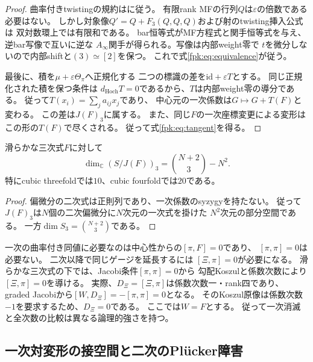 \begin{proof}
曲率付きtwistingの規約は\cite[Section~2]{CT}に従う。
有限rank MFの行列$Q$は$\varepsilon$の倍数である必要はない。
しかし対象像$Q'=Q+F_3(Q,Q,Q)$および射のtwisting挿入公式は
双対数環上では有限和である。
bar恒等式がMF方程式と関手恒等式を与え、逆bar写像で互いに逆な
$A_\infty$関手が得られる。写像は内部weight零で
$t$を微分しないので内部shiftと$(3)\simeq[2]$を保つ。
これで式\eqref{fpk:eq:equivalence}が従う。

最後に、積を$\mu+\varepsilon\Theta_\pi$へ正規化する
二つの標識の差を$\mathrm{id}+\varepsilon T$とする。
同じ正規化された積を保つ条件は
$d_{\mathrm{Hoch}}T=0$であるから、$T$は内部weight零の導分である。
従って$T(x_i)=\sum_j a_{ij}x_j$であり、
中心元の一次係数は$G\mapsto G+T(F)$と変わる。
この差は$J(F)_3$に属する。
また、同じ$F$の一次座標変更による変形は
この形の$T(F)$で尽くされる。
従って式\eqref{fpk:eq:tangent}を得る。
\end{proof}

\begin{corollary}[Jacobian接空間の次元]
\label{fpk:cor:dimension}
滑らかな三次式$F$に対して
\begin{equation}\label{fpk:eq:dimension}
 \dim_{\mathbb C}(S/J(F))_3
 =\binom{N+2}{3}-N^2.
\end{equation}
特にcubic threefoldでは$10$、cubic fourfoldでは$20$である。
\end{corollary}
\begin{proof}
偏微分の二次式は正則列であり、一次係数のsyzygyを持たない。
従って$J(F)_3$は$N$個の二次偏微分に$N$次元の一次式を掛けた
$N^2$次元の部分空間である。
一方$\dim S_3=\binom{N+2}{3}$である。
\end{proof}

\begin{remark}[Jacobi条件が必要になる位置]
\label{fpk:rem:jacobi}
一次の曲率付き同値に必要なのは中心性からの$[\pi,F]=0$であり、
$[\pi,\pi]=0$は必要ない。
二次以降で同じゲージを延長するには
$[\Xi,\pi]=0$が必要になる。
滑らかな三次式の下では、Jacobi条件$[\pi,\pi]=0$から
勾配Koszulと係数次数により$[\Xi,\pi]=0$を導ける。
実際、$D_\Xi=[\Xi,\pi]$は係数次数一・rank四であり、
graded Jacobiから$[W,D_\Xi]=-[\pi,\pi]=0$となる。
そのKoszul原像は係数次数$-1$を要求するため、$D_\Xi=0$である。
ここでは$W=F$とする。
従って一次消滅と全次数の比較は異なる論理的強さを持つ。
\end{remark}


\subsection{一次対変形の接空間と二次のPl\"ucker障害}

